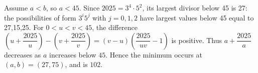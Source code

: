 Assume $a<b$, so $a<45$. Since $2025=3^4\cdot5^2$, its largest divisor below 45 is 27: the possibilities of form $3^i5^j$ with $j=0,1,2$ have largest values below 45 equal to 27,15,25. For $0<u<v<45$, the difference $(u+\dfrac{2025}{u})-(v+\dfrac{2025}{v})=(v-u)(\dfrac{2025}{uv}-1)$ is positive. Thus $a+\dfrac{2025}{a}$ decreases as $a$ increases below $45$. Hence the minimum occurs at $(a,b)=(27,75)$, and is $\boxed{102}$.
